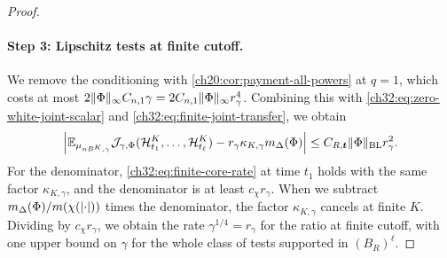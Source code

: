 \begin{proof}
\paragraph{Step 3: Lipschitz tests at finite cutoff.}
We remove the conditioning with \cref{ch20:cor:payment-all-powers} at $q=1$, which costs at most $2\lVert \Phi\rVert_\infty C_{n,1}\gamma=2C_{n,1}\lVert \Phi\rVert_\infty r_\gamma^4$. Combining this with \eqref{ch32:eq:zero-white-joint-scalar} and \eqref{ch32:eq:finite-joint-transfer}, we obtain
\begin{equation}\label{ch32:eq:original-joint-core-rate}
 \Bigl\lvert\mathbb E_{\mu_{nB^K,\gamma}}\mathcal J_{\gamma,\Phi}(\mathcal H^K_{t_1},\dots,\mathcal H^K_{t_\ell})-r_\gamma\kappa_{K,\gamma}m_\Delta(\Phi)\Bigr\rvert\le C_{R,\boldsymbol t}\lVert \Phi\rVert_{\mathrm{BL}}r_\gamma^2.
\end{equation}
For the denominator, \eqref{ch32:eq:finite-core-rate} at time $t_1$ holds with the same factor $\kappa_{K,\gamma}$, and the denominator is at least $c_\chi r_\gamma$. When we subtract $m_\Delta(\Phi)/m(\chi(\lvert \cdot\rvert))$ times the denominator, the factor $\kappa_{K,\gamma}$ cancels at finite $K$. Dividing by $c_\chi r_\gamma$, we obtain the rate $\gamma^{1/4}=r_\gamma$ for the ratio at finite cutoff, with one upper bound on $\gamma$ for the whole class of tests supported in $(B_R)^\ell$.


\end{proof}
